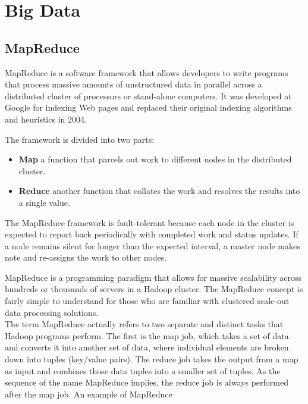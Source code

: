 \documentclass[12pt]{article}
\begin{document}

\section{Big Data}
\subsection{MapReduce}
MapReduce is a software framework that allows developers to write programs that process massive amounts of unstructured data in parallel across a distributed cluster of processors or stand-alone computers. It was developed at Google for indexing Web pages and replaced their original indexing algorithms and heuristics in 2004.

The framework is divided into two parts:
\begin{itemize}
\item \textbf{Map} a function that parcels out work to different nodes in the distributed cluster.
\item \textbf{Reduce} another function that collates the work and resolves the results into a single value.
\end{itemize}

The MapReduce framework is fault-tolerant because each node in the cluster is expected to report back periodically with completed work and status updates. If a node remains silent for longer than the expected interval, a master node makes note and re-assigns the work to other nodes.


MapReduce is a programming paradigm that allows for massive scalability across hundreds or thousands of servers in a Hadoop cluster. The MapReduce concept is fairly simple to understand for those who are familiar with clustered scale-out data processing solutions.
\\
The term MapReduce actually refers to two separate and distinct tasks that Hadoop programs perform. The first is the map job, which takes a set of data and converts it into another set of data, where individual elements are broken down into tuples (key/value pairs). The reduce job takes the output from a map as input and combines those data tuples into a smaller set of tuples. As the sequence of the name MapReduce implies, the reduce job is always performed after the map job.
An example of MapReduce
\end{document}
